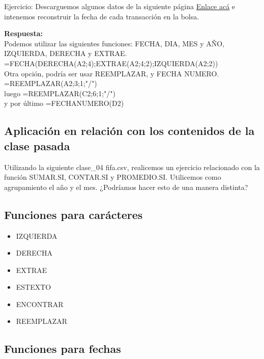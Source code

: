 \documentclass[12 pt,letterpaper]{article}
\newenvironment{solution}
{\begin{mdframed} \textbf{Respuesta:} \ \\}
	{\end{mdframed}}
\begin{document}
\noindent
{\Huge \faBell} Ejercicio: Descarguemos algunos datos de la siguiente página  \href{https://es.investing.com/indices/investing.com-btc-usd-historical-data}{Enlace acá} e intenemos reconstruir la fecha de cada transacción en la bolsa.

\begin{solution}
	Podemos utilizar las siguientes funciones: FECHA, DIA, MES y AÑO, IZQUIERDA, DERECHA y EXTRAE. \\
	
	=FECHA(DERECHA(A2;4);EXTRAE(A2;4;2);IZQUIERDA(A2;2)) \\
	
	Otra opción, podría ser usar REEMPLAZAR, y FECHA NUMERO. \\
	
	=REEMPLAZAR(A2;3;1;"/") \\
	
	luego =REEMPLAZAR(C2;6;1;"/") \\
	
	y por último =FECHANUMERO(D2)	
\end{solution}

\subsection{Aplicación en relación con los contenidos de la clase pasada}

Utilizando la siguiente clase\_04 fifa.csv, realicemos un ejercicio relacionado con la función SUMAR.SI, CONTAR.SI y PROMEDIO.SI. Utilicemos como agrupamiento el año y el mes. ¿Podríamos hacer esto de una manera distinta?

\subsection{Funciones para carácteres}

\begin{itemize}
	\item IZQUIERDA
	\item DERECHA
	\item EXTRAE
	\item ESTEXTO
	\item ENCONTRAR
	\item REEMPLAZAR
\end{itemize}

\subsection{Funciones para fechas}
\end{document}
